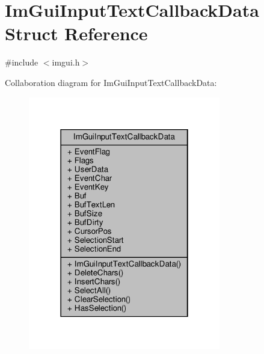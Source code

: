 \hypertarget{structImGuiInputTextCallbackData}{}\section{Im\+Gui\+Input\+Text\+Callback\+Data Struct Reference}
\label{structImGuiInputTextCallbackData}


{\ttfamily \#include $<$imgui.\+h$>$}



Collaboration diagram for Im\+Gui\+Input\+Text\+Callback\+Data\+:
\nopagebreak
\begin{figure}[H]
\begin{center}
\leavevmode
\includegraphics[width=238pt]{structImGuiInputTextCallbackData__coll__graph}
\end{center}
\end{figure}
